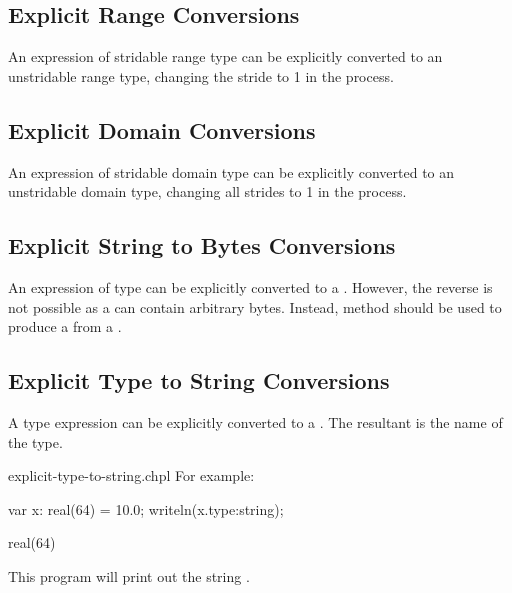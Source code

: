 \subsection{Explicit Range Conversions}
\label{Explicit_Range_Conversions}

An expression of stridable range type can be explicitly converted
to an unstridable range type, changing the stride to 1 in the process.

\subsection{Explicit Domain Conversions}
\label{Explicit_Domain_Conversions}

An expression of stridable domain type can be explicitly converted
to an unstridable domain type, changing all strides to 1 in the process.

\subsection{Explicit String to Bytes Conversions}
\label{Explicit_String_to_Bytes_Conversions}

An expression of  type can be explicitly converted to a
. However, the reverse is not possible as a  can contain
arbitrary bytes. Instead,  method should be used to produce
a  from a .

\subsection{Explicit Type to String Conversions}
\label{Explicit_Type_to_String_Conversions}

A type expression can be explicitly converted to a . The resultant
 is the name of the type.

\begin{chapelexample}{explicit-type-to-string.chpl}
For example:
\begin{chapel}
var x: real(64) = 10.0;
writeln(x.type:string);
\end{chapel}
\begin{chapeloutput}
real(64)
\end{chapeloutput}
This program will print out the string .
\end{chapelexample}
